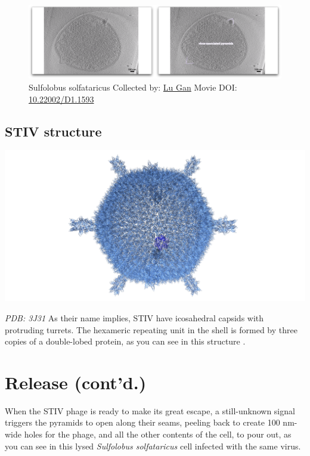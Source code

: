 \documentclass[]{tufte-book}
\begin{document}
\begin{figure}
\includegraphics{movie_stills/10_8} \caption[Sulfolobus solfataricus Collected by:
\protect\hyperlink{lu_gan}{Lu Gan} Movie DOI:
\href{https://doi.org/10.22002/D1.1593}{10.22002/D1.1593}]{Sulfolobus solfataricus Collected by:
\protect\hyperlink{lu_gan}{Lu Gan} Movie DOI:
\href{https://doi.org/10.22002/D1.1593}{10.22002/D1.1593}}\label{fig:10-8}
\end{figure}

\subsection{STIV structure}\label{STIV_structure}

\includegraphics{img/schematics/10_8_1}

\emph{PDB: 3J31} As their name implies, STIV have icosahedral capsids
with protruding turrets. The hexameric repeating unit in the shell is
formed by three copies of a double-lobed protein, as you can see in this
structure \citep{veesler2013}.

\section{Release (cont'd.)}\label{release-contd.}

When the STIV phage is ready to make its great escape, a still-unknown
signal triggers the pyramids to open along their seams, peeling back to
create 100 nm-wide holes for the phage, and all the other contents of
the cell, to pour out, as you can see in this lysed \emph{Sulfolobus
solfataricus} cell infected with the same virus.
\end{document}
